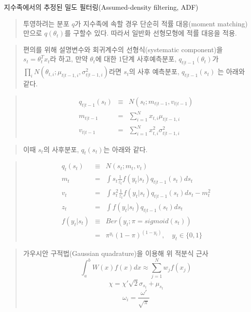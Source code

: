 \documentclass[11pt]{article}
\begin{document}
    지수족에서의 추정된 밀도 필터링(Assumed-density filtering, ADF)

    \begin{quote}
투영하려는 분포 \(q\)가 지수족에 속할 경우 단순히 적률 대응(moment
matching)만으로 \(q(\theta_t)\)를 구할수 있다. 따라서 일반화 선형모형에
적률 대응을 적용.
\end{quote}

    \begin{quote}
편의를 위해 설명변수와 회귀계수의 선형식(systematic component)을
\(s_t=\theta_t^T x_t\)라 하고, 만약 \(\theta_t\)에 대한 1단계
사후예측분포,
\(q_{t|t-1}(\theta_t)\)가\(\prod_i N(\theta_{t,i};\mu_{t|t-1,i},\sigma^2_{t|t-1,i})\)라면
\(s_t\)의 사후 예측분포, \(q_{t|t-1}(s_t)\) 는 아래와 같다.
\end{quote}

\begin{quote}
\begin{eqnarray}
q_{t|t-1}(s_{t}) &\equiv& N(s_t;m_{t|t-1}, {v}_{t|t-1})
\\ m_{t|t-1} &=& \sum^N_{i=1}x_{t,i}\mu_{t|t-1,i}
\\ {v}_{t|t-1} &=& \sum^N_{i=1}x^2_{t,i}{\sigma}^2_{t|t-1,i}
\end{eqnarray}
\end{quote}

\begin{quote}
이때 \(s_t\)의 사후분포, \(q_t(s_t)\)는 아래와 같다.
\end{quote}

\begin{quote}
\begin{eqnarray}
q_t(s_t) &\equiv& N(s_t; m_t, v_t)
\\ m_t &=& \int s_t \frac{1}{z_t} f(y_t|s_t) q_{t|t-1}(s_t)ds_t
\\ v_t &=& \int s^2_t \frac{1}{z_t} f(y_t|s_t) q_{t|t-1}(s_t) ds_t - m_t^2
\\ z_t &=& \int f(y_t|s_t) q_{t|t-1}(s_t)ds_t
\\ f(y_t|s_t) &\equiv& Ber(y_t;\pi = sigmoid(s_t))
\\ & =& \pi^{y_t} (1-\pi)^{(1-y_t)}, \quad y_t \in \{0,1\}
\end{eqnarray}
\end{quote}

    \begin{quote}
가우시안 구적법(Gaussian quadrature)을 이용해 위 적분식 근사
\[\int^b_a W(x)f(x)dx \approx \sum^N_{j=1}w_j f(x_j)\]
\[\chi=\chi'\sqrt{2}\sigma_{s_t}+\mu_{s_t}\]
\[\omega_i = \frac{\omega'}{\sqrt{\pi}}\]
\end{quote}
\end{document}
